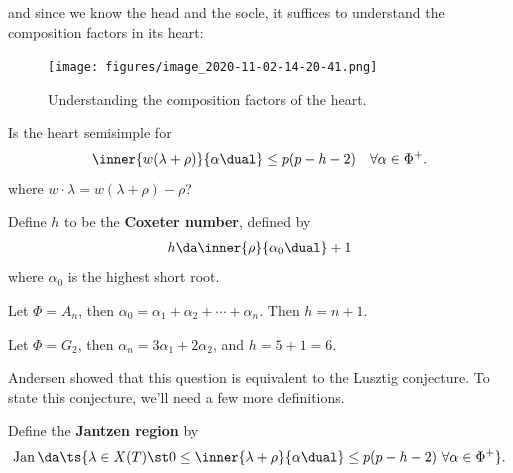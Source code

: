 and since we know the head and the socle, it suffices to understand the
composition factors in its heart:

\begin{figure}
\centering
\texttt{[image: figures/image\_2020-11-02-14-20-41.png]}
\caption{Understanding the composition factors of the heart.}
\end{figure}

\begin{remark}

Is the heart semisimple for
\begin{align*}  
\inner{w(\lambda + \rho)}{\alpha\dual} \leq p(p-h-2) && \forall \alpha\in \Phi^+
.\end{align*} where \(w\cdot\lambda = w(\lambda + \rho) - \rho\)?

\end{remark}

\begin{definition}

Define \(h\) to be the \textbf{Coxeter number}, defined by
\begin{align*}  
h \da \inner{\rho}{\alpha_0\dual} + 1
\end{align*} where \(\alpha_0\) is the highest short root.

\end{definition}

\begin{example}[?]

Let \(\Phi = A_n\), then
\(\alpha_0 = \alpha_1 + \alpha_2 + \cdots + \alpha_n\). Then \(h=n+1\).

\end{example}

\begin{example}[?]

Let \(\Phi = G_2\), then \(\alpha_n = 3\alpha_1 + 2\alpha_2\), and
\(h = 5+1 = 6\).

\end{example}

\begin{remark}

Andersen showed that this question is equivalent to the Lusztig
conjecture. To state this conjecture, we'll need a few more definitions.

\end{remark}

\begin{definition}

Define the \textbf{Jantzen region} by
\begin{align*}  
\operatorname{Jan} \da \ts{\lambda \in X(T) \st 
0 \leq \inner{\lambda + \rho}{\alpha\dual} \leq p(p-h-2) \,\, \forall \alpha\in \Phi^+
}
.\end{align*}

\end{definition}

